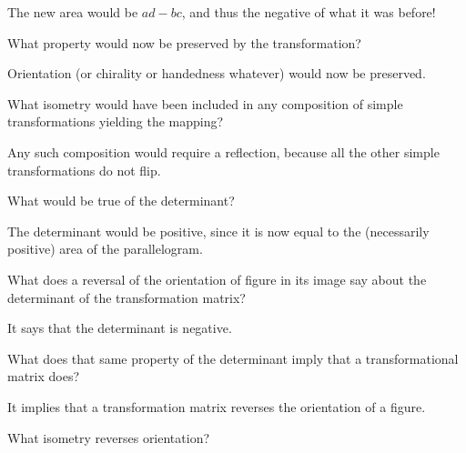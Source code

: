 \documentclass[../key.tex]{subfiles}
\begin{document}
The new area would be $ad-bc$, and thus the negative of what it was before!

\begin{iinner_problem}
\item What property would now be preserved by the transformation?
\end{iinner_problem}

Orientation (or chirality or handedness whatever) would now be preserved.

\begin{iinner_problem}
\item What isometry would have been included in any composition of simple transformations yielding the mapping?
\end{iinner_problem}

Any such composition would require a reflection, because all the other simple transformations do not flip.

\begin{iinner_problem}
\item What would be true of the determinant?
\end{iinner_problem}

The determinant would be positive, since it is now equal to the (necessarily positive) area of the parallelogram.

\begin{inner_problem}
\item
\end{inner_problem}

\begin{iinner_problem}[start=1]
\item What does a reversal of the orientation of figure in its image say about the determinant of the transformation matrix?
\end{iinner_problem}

It says that the determinant is negative.

\begin{iinner_problem}
\item What does that same property of the determinant imply that a transformational matrix does?
\end{iinner_problem}

It implies that a transformation matrix reverses the orientation of a figure.

\begin{iinner_problem}
\item What isometry reverses orientation?
\end{iinner_problem}
\end{document}

